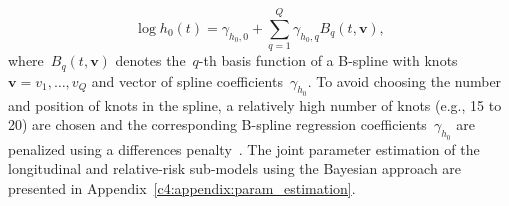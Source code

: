 \begin{equation*}
\log{h_0(t)} = \gamma_{h_0,0} + \sum_{q=1}^Q \gamma_{h_0,q} B_q(t, \boldsymbol{v}),
\end{equation*}
where~$B_q(t, \boldsymbol{v})$ denotes the~$q$-th basis function of a B-spline with knots~$\boldsymbol{v} = v_1, \ldots, v_Q$ and vector of spline coefficients~$\gamma_{h_0}$. To avoid choosing the number and position of knots in the spline, a relatively high number of knots (e.g., 15 to 20) are chosen and the corresponding B-spline regression coefficients~$\gamma_{h_0}$ are penalized using a differences penalty~\citep{eilers1996flexible}. The joint parameter estimation of the longitudinal and relative-risk sub-models using the Bayesian approach are presented in Appendix~\ref{c4:appendix:param_estimation}.